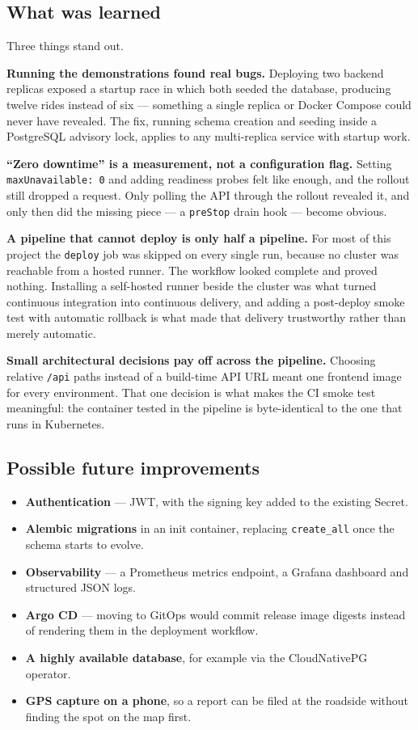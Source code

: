 \documentclass[10pt,a4paper]{article}
\newcommand{\cd}[1]{\texttt{\small #1}}
\begin{document}
\subsection{What was learned}

Three things stand out.

\textbf{Running the demonstrations found real bugs.} Deploying two backend
replicas exposed a startup race in which both seeded the database, producing
twelve rides instead of six --- something a single replica or Docker Compose
could never have revealed. The fix, running schema creation and seeding inside
a PostgreSQL advisory lock, applies to any multi-replica service with startup
work.

\textbf{``Zero downtime'' is a measurement, not a configuration flag.} Setting
\cd{maxUnavailable: 0} and adding readiness probes felt like enough, and the
rollout still dropped a request. Only polling the API through the rollout
revealed it, and only then did the missing piece --- a \cd{preStop} drain hook
--- become obvious.

\textbf{A pipeline that cannot deploy is only half a pipeline.} For most of
this project the \cd{deploy} job was skipped on every single run, because no
cluster was reachable from a hosted runner. The workflow looked complete and
proved nothing. Installing a self-hosted runner beside the cluster was what
turned continuous integration into continuous delivery, and adding a
post-deploy smoke test with automatic rollback is what made that delivery
trustworthy rather than merely automatic.

\textbf{Small architectural decisions pay off across the pipeline.} Choosing
relative \cd{/api} paths instead of a build-time API URL meant one frontend
image for every environment. That one decision is what makes the CI smoke test
meaningful: the container tested in the pipeline is byte-identical to the one
that runs in Kubernetes.

\subsection{Possible future improvements}

\begin{itemize}
  \item \textbf{Authentication} --- JWT, with the signing key added to the
        existing Secret.
  \item \textbf{Alembic migrations} in an init container, replacing
        \cd{create\_all} once the schema starts to evolve.
  \item \textbf{Observability} --- a Prometheus metrics endpoint, a Grafana
        dashboard and structured JSON logs.
  \item \textbf{Argo CD} --- moving to GitOps would commit release image
        digests instead of rendering them in the deployment workflow.
  \item \textbf{A highly available database}, for example via the CloudNativePG
        operator.
  \item \textbf{GPS capture on a phone}, so a report can be filed at the
        roadside without finding the spot on the map first.
\end{itemize}
\end{document}

